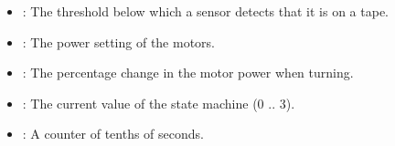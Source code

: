 
\begin{itemize}
\item {}: The threshold below which a sensor detects that it
is on a tape.

\item {}: The power setting of the motors.

\item {}: The percentage change in the motor power when turning.
\end{itemize}


\begin{itemize}
\item {}: The current value of the state machine (0 .. 3). 
\item {}:  A counter of tenths of seconds.

\end{itemize}


